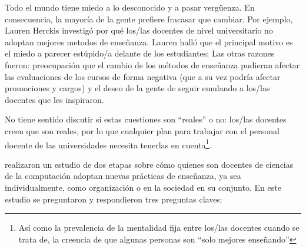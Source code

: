 
Todo el mundo tiene miedo a lo desconocido y a pasar vergüenza. En consecuencia,
la mayoría de la gente prefiere fracasar que cambiar.
Por ejemplo,
Lauren Herckis investigó 
{por qué los/las docentes de nivel universitario no adoptan mejores metodos de enseñanza}.
Lauren halló que el principal motivo es el miedo a parecer estúpido/a delante de  los estudiantes; 
Las otras razones fueron:
preocupación que el cambio de los métodos de enseñanza pudieran afectar las evaluaciones de los cursos de forma negativa
(que  a su vez podría afectar promociones y cargos) 
y el deseo de la gente de seguir emulando a los/las docentes que les inspiraron. 

No tiene sentido discutir si estas cuestiones son ``reales'' o no:
los/las docentes creen que son reales,
por lo que cualquier plan para trabajar con el personal docente de las universidades necesita tenerlas en cuenta\footnote{
Así como la prevalencia de la mentalidad fija entre los/las docentes cuando se trata de, 
la creencia de que algunas personas son ``solo mejores enseñando'' }.

\cite{Bark2015} realizaron un estudio de dos etapas sobre cómo quienes 
son docentes de ciencias de la computación adoptan nuevas prácticas de enseñanza, 
ya sea individualmente, como organización o en la sociedad en su conjunto. En este estudio se preguntaron 
y respondieron tres preguntas claves:

